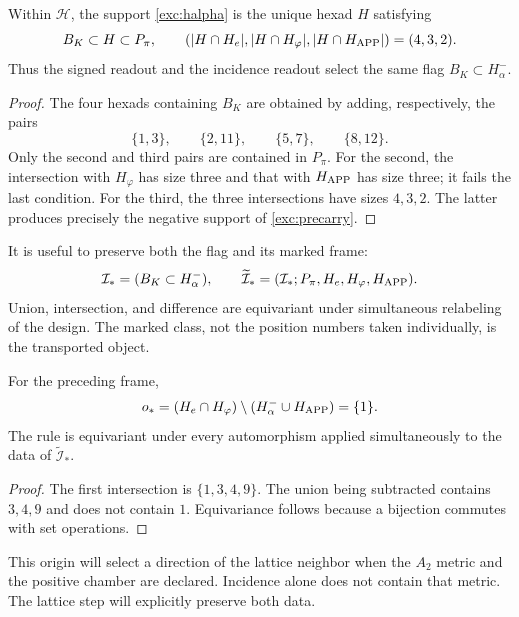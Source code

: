 

\begin{proposition}
\label{exc:selector-bandera}
Within $\mathcal H$, the support \eqref{exc:halpha} is the unique hexad
$H$ satisfying
\[
 B_K\subset H\subset P_\pi,
 \qquad
 (|H\cap H_e|,|H\cap H_\varphi|,|H\cap H_{\rm APP}|)=(4,3,2).
\]
Thus the signed readout and the incidence readout select the same
flag $B_K\subset H^-_\alpha$.
\end{proposition}

\begin{proof}
The four hexads containing $B_K$ are obtained by adding,
respectively, the pairs
\[
 \{1,3\},\qquad\{2,11\},\qquad\{5,7\},\qquad\{8,12\}.
\]
Only the second and third pairs are contained in $P_\pi$. For the
second, the intersection with $H_\varphi$ has size three and that with
$H_{\rm APP}$ has size three; it fails the last condition. For the
third, the three intersections have sizes $4,3,2$. The latter
produces precisely the negative support of \eqref{exc:precarry}.
\end{proof}

It is useful to preserve both the flag and its marked frame:
\[
 \mathcal I_*=(B_K\subset H^-_\alpha),\qquad
 \widetilde{\mathcal I}_*
   =(\mathcal I_*;P_\pi,H_e,H_\varphi,H_{\rm APP}).
\]
Union, intersection, and difference are equivariant
under simultaneous relabeling of the design. The marked class, not the
position numbers taken individually, is the transported object.

\begin{lemma}
\label{exc:origen}
For the preceding frame,
\[
 o_*=(H_e\cap H_\varphi)
           \setminus(H^-_\alpha\cup H_{\rm APP})=\{1\}.
\]
The rule is equivariant under every automorphism applied simultaneously
to the data of $\widetilde{\mathcal I}_*$.
\end{lemma}

\begin{proof}
The first intersection is $\{1,3,4,9\}$. The union being subtracted
contains $3,4,9$ and does not contain $1$. Equivariance follows because a
bijection commutes with set operations.
\end{proof}

This origin will select a direction of the lattice neighbor when the
$A_2$ metric and the positive chamber are declared. Incidence alone
does not contain that metric. The lattice step will explicitly preserve
both data.

